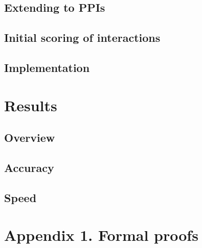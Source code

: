 \documentclass[11pt]{article}
\begin{document}
\subsection*{Extending to PPIs}

\subsection*{Initial scoring of interactions}

\subsection*{Implementation}

\section*{Results}

\subsection*{Overview}

\subsection*{Accuracy}

\subsection*{Speed}

\section*{Appendix 1. Formal proofs}
\end{document}
